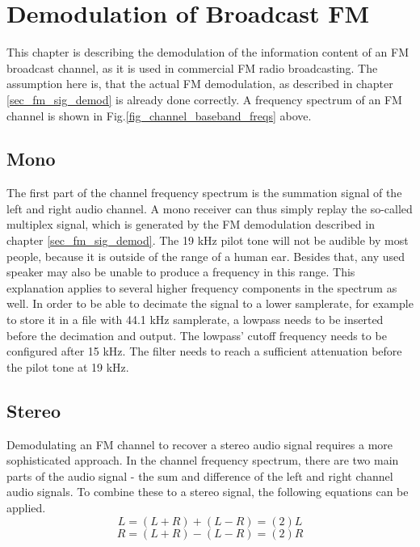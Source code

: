 \documentclass[conference]{IEEEtran}
\begin{document}
\section{Demodulation of Broadcast FM}
  This chapter is describing the demodulation of the information content of an FM broadcast channel, as it is used in commercial FM radio broadcasting.
  The assumption here is, that the actual FM demodulation, as described in chapter \ref{sec_fm_sig_demod} is already done correctly.
  A frequency spectrum of an FM channel is shown in Fig.\ref{fig_channel_baseband_freqs} above.

  \subsection{Mono}
  \label{demod_mono}
    The first part of the channel frequency spectrum is the summation signal of the left and right audio channel.
    A mono receiver can thus simply replay the so-called multiplex signal, which is generated by the FM demodulation described in chapter \ref{sec_fm_sig_demod}. The 19 kHz pilot tone will not be audible by most people, because it is outside of the range of a human ear. Besides that, any used speaker may also be unable to produce a frequency in this range. This explanation applies to several higher frequency components in the spectrum as well.
    In order to be able to decimate the signal to a lower samplerate, for example to store it in a file with 44.1 kHz samplerate, a lowpass needs to be inserted before the decimation and output.
    The lowpass' cutoff frequency needs to be configured after 15 kHz.
    The filter needs to reach a sufficient attenuation before the pilot tone at 19 kHz.

  \subsection{Stereo}
    Demodulating an FM channel to recover a stereo audio signal requires a more sophisticated approach.
    In the channel frequency spectrum, there are two main parts of the audio signal - the sum and difference of the left and right channel audio signals.
    To combine these to a stereo signal, the following equations can be applied.
    \begin{equation*}
      L = (L+R) + (L-R) = (2)L
    \end{equation*}
    \begin{equation}
      R = (L+R) - (L-R) = (2)R
      \label{equ_stereo_from_sum_diff}
    \end{equation}
\end{document}
